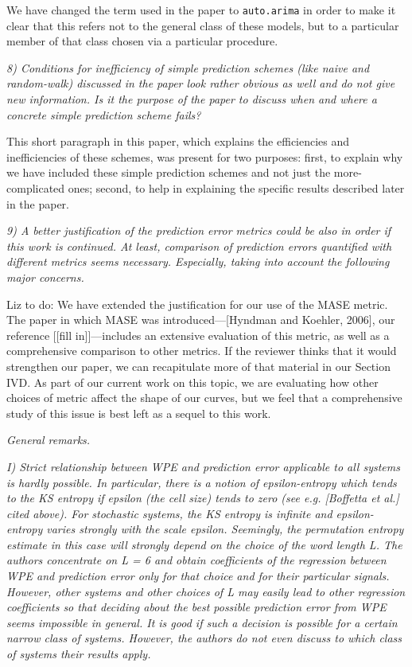 \documentclass[12pt]{article}
\newcommand{\alert}[1]{{\color{red}#1}}
\begin{document}
We have changed the term used in the paper to {\tt auto.arima} in
order to make it clear that this refers not to the general class of
these models, but to a particular member of that class chosen via a
particular procedure.

\smallskip

\emph{8) Conditions for inefficiency of simple prediction schemes
  (like naive and random-walk) discussed in the paper look rather
  obvious as well and do not give new information. Is it the purpose
  of the paper to discuss when and where a concrete simple prediction
  scheme fails?}

This short paragraph in this paper, which explains the efficiencies
and inefficiencies of these schemes, was present for two purposes:
first, to explain why we have included these simple prediction schemes
and not just the more-complicated ones; second, to help in explaining
the specific results described later in the paper.

\smallskip

\emph{9) A better justification of the prediction error metrics could
  be also in order if this work is continued. At least, comparison of
  prediction errors quantified with different metrics seems
  necessary. Especially, taking into account the following major
  concerns.}

\alert{Liz to do: We have extended the justification for our use of
  the MASE metric.}  The paper in which MASE was introduced---[Hyndman
  and Koehler, 2006], our reference \alert{[[fill in]]}---includes an
extensive evaluation of this metric, as well as a comprehensive
comparison to other metrics.  If the reviewer thinks that it would
strengthen our paper, we can recapitulate more of that material in our
Section IVD. As part of our current work on this topic, we are
evaluating how other choices of metric affect the shape of our curves,
but we feel that a comprehensive study of this issue is best left as a
sequel to this work.

\smallskip

\noindent\emph{General remarks.}

\emph{I) Strict relationship between WPE and prediction error
  applicable to all systems is hardly possible. In particular, there
  is a notion of epsilon-entropy which tends to the KS entropy if
  epsilon (the cell size) tends to zero (see e.g.  [Boffetta et al.]
  cited above). For stochastic systems, the KS entropy is infinite and
  epsilon-entropy varies strongly with the scale epsilon. Seemingly,
  the permutation entropy estimate in this case will strongly depend
  on the choice of the word length L. The authors concentrate on L = 6
  and obtain coefficients of the regression between WPE and prediction
  error only for that choice and for their particular
  signals. However, other systems and other choices of L may easily
  lead to other regression coefficients so that deciding about the
  best possible prediction error from WPE seems impossible in
  general. It is good if such a decision is possible for a certain
  narrow class of systems. However, the authors do not even discuss to
  which class of systems their results apply.}
\end{document}
